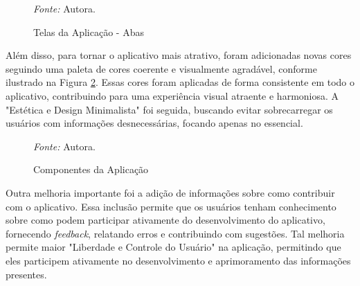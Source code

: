 \begin{figure}[h!]
	\centering
	\caption{Telas da Aplicação - Abas}
	\begin{tablenotes}[flushleft]
		\centering
		\item \textit{Fonte:} Autora.
	\end{tablenotes}
	\label{fig24}
\end{figure}

Além disso, para tornar o aplicativo mais atrativo, foram adicionadas novas cores seguindo uma paleta de cores coerente e visualmente  agradável, conforme ilustrado na Figura \ref{fig25}. Essas cores foram aplicadas de forma consistente em todo o aplicativo, 
contribuindo para uma experiência visual atraente e harmoniosa. A "Estética e Design Minimalista" foi seguida, buscando evitar sobrecarregar os usuários com informações desnecessárias, focando apenas no essencial.

\begin{figure}[h!]
	\centering
	\caption{Componentes da Aplicação}
	\begin{tablenotes}[flushleft]
		\centering
		\item \textit{Fonte:} Autora.
	\end{tablenotes}
	\label{fig25}
\end{figure}

Outra melhoria importante foi a adição de informações sobre como contribuir com o aplicativo. Essa inclusão permite que os usuários tenham conhecimento sobre como podem participar ativamente do desenvolvimento do aplicativo, 
fornecendo \textit{feedback}, relatando erros e contribuindo com sugestões. Tal melhoria permite maior "Liberdade e Controle do Usuário" na aplicação, permitindo que eles participem ativamente no desenvolvimento e aprimoramento 
das informações presentes.

